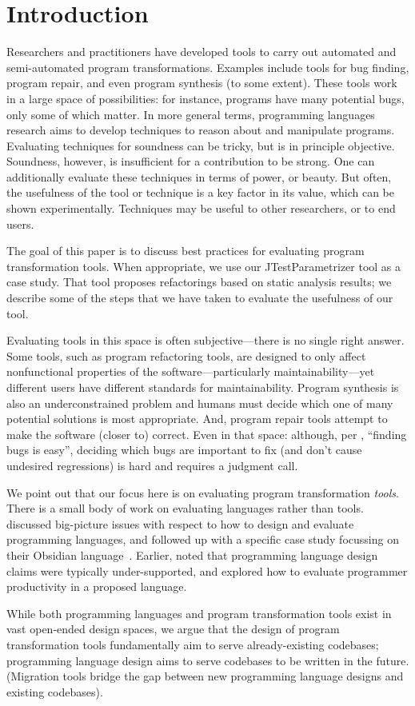 \section{Introduction}
Researchers and practitioners have developed tools to carry out
automated and semi-automated program transformations.  Examples
include tools for bug finding, program repair, and even 
program synthesis (to some extent). These tools work in a large space of possibilities:
for instance, programs have many potential bugs, only some of which
matter.
In more general terms, programming languages research aims to develop
techniques to reason about and manipulate programs. Evaluating
techniques for soundness can be tricky, but is in principle
objective. Soundness, however, is insufficient for a contribution to
be strong. One can additionally evaluate these techniques in terms of
power, or beauty. But often, the usefulness of the tool or technique
is a key factor in its value, which can be shown
experimentally. Techniques may be useful to other researchers, or to
end users.

The goal of this paper is to discuss best practices for evaluating
program transformation tools. When appropriate, we use our
JTestParametrizer tool as a case study. That tool proposes
refactorings based on static analysis results; we describe some of the
steps that we have taken to evaluate the usefulness of our tool.

Evaluating tools in this space is often subjective---there is no
single right answer. Some tools, such as program refactoring tools,
are designed to only affect nonfunctional properties of the
software---particularly maintainability---yet different users have
different standards for maintainability. Program synthesis is also an
underconstrained problem and humans must decide which one of many
potential solutions is most appropriate. And, program repair
tools attempt to make the software (closer to) correct. Even in that
space: although, per , ``finding bugs is
easy'', deciding which bugs are
important to fix (and don't cause undesired regressions) is hard and
requires a judgment call. 

We point out that our focus here is on evaluating program transformation \emph{tools}.
There is a small body of work on evaluating languages rather than tools.
discussed big-picture issues with respect to how to design and evaluate programming languages, and followed up with a specific case study focussing on their Obsidian
language~\cite{coblenz20:_can_advan_type_system_be_usabl}.
Earlier,  noted that programming 
language design claims were typically under-supported, and  explored how to evaluate programmer productivity in a
proposed language. 

While both programming languages and program transformation tools exist
in vast open-ended design spaces, we argue that the design of program transformation
tools fundamentally aim to serve already-existing codebases; programming 
language design aims to serve codebases to be written in the future.
(Migration tools bridge the gap between new programming language designs
and existing codebases).

